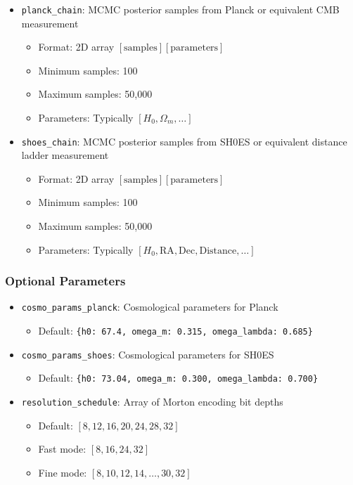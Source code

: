 \documentclass[11pt]{article}
\begin{document}
\begin{itemize}
    \item \texttt{planck\_chain}: MCMC posterior samples from Planck or equivalent CMB measurement
        \begin{itemize}
            \item Format: 2D array $[\text{samples}][\text{parameters}]$
            \item Minimum samples: 100
            \item Maximum samples: 50,000
            \item Parameters: Typically $[H_0, \Omega_m, \ldots]$
        \end{itemize}

    \item \texttt{shoes\_chain}: MCMC posterior samples from SH0ES or equivalent distance ladder measurement
        \begin{itemize}
            \item Format: 2D array $[\text{samples}][\text{parameters}]$
            \item Minimum samples: 100
            \item Maximum samples: 50,000
            \item Parameters: Typically $[H_0, \text{RA}, \text{Dec}, \text{Distance}, \ldots]$
        \end{itemize}
\end{itemize}

\subsubsection{Optional Parameters}

\begin{itemize}
    \item \texttt{cosmo\_params\_planck}: Cosmological parameters for Planck
        \begin{itemize}
            \item Default: \texttt{\{h0: 67.4, omega\_m: 0.315, omega\_lambda: 0.685\}}
        \end{itemize}

    \item \texttt{cosmo\_params\_shoes}: Cosmological parameters for SH0ES
        \begin{itemize}
            \item Default: \texttt{\{h0: 73.04, omega\_m: 0.300, omega\_lambda: 0.700\}}
        \end{itemize}

    \item \texttt{resolution\_schedule}: Array of Morton encoding bit depths
        \begin{itemize}
            \item Default: $[8, 12, 16, 20, 24, 28, 32]$
            \item Fast mode: $[8, 16, 24, 32]$
            \item Fine mode: $[8, 10, 12, 14, \ldots, 30, 32]$
        \end{itemize}
\end{itemize}
\end{document}
